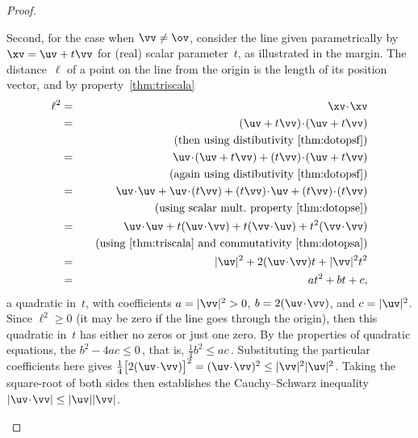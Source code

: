 \begin{proof}
\begin{itemize}
Second, for the case when \(\vv\neq\ov\), consider the line given parametrically by \(\xv=\uv+t\vv\) for (real) scalar parameter~\(t\), as illustrated in the margin.
The distance~\(\ell\) of a point on the line from the origin is the length of its position vector, and by property~\ref{thm:triscala}
%
\begin{eqnarray*}
\ell^2&=&\xv\cdot\xv
\\&=&(\uv+t\vv)\cdot(\uv+t\vv)
\\&&\quad(\text{then using distibutivity~\ref{thm:dotopsf}})
\\&=&\uv\cdot(\uv+t\vv)+(t\vv)\cdot(\uv+t\vv)
\\&&\quad(\text{again using distibutivity~\ref{thm:dotopsf}})
\\&=&\uv\cdot\uv+\uv\cdot(t\vv)+(t\vv)\cdot\uv+(t\vv)\cdot(t\vv)
\\&&\quad(\text{using scalar mult.\ property~\ref{thm:dotopse}})
\\&=&\uv\cdot\uv+t(\uv\cdot\vv)+t(\vv\cdot\uv)+t^2(\vv\cdot\vv)
\\&&\quad(\text{using~\ref{thm:triscala} and commutativity~\ref{thm:dotopsa}})
\\&=&|\uv|^2+2(\uv\cdot\vv)t+|\vv|^2t^2
\\&=&at^2+bt+c,
\end{eqnarray*}
a quadratic in~\(t\), with coefficients \(a=|\vv|^2>0\), \(b=2(\uv\cdot\vv)\), and \(c=|\uv|^2\).
Since \(\ell^2\geq0\) (it may be zero if the line goes through the origin), then this quadratic in~\(t\) has either no zeros or just one zero.
By the properties of quadratic equations, the  \(b^2-4ac\leq0\)\,, that is, \(\tfrac14b^2\leq ac\)\,.
Substituting the particular coefficients here gives 
\(\tfrac14\big[2(\uv\cdot\vv)\big]^2=(\uv\cdot\vv)^2\leq|\vv|^2|\uv|^2\).
Taking the square-root of both sides then establishes the Cauchy--Schwarz inequality  \(|\uv\cdot\vv|\leq|\uv||\vv|\).


\end{itemize}
\end{proof}
